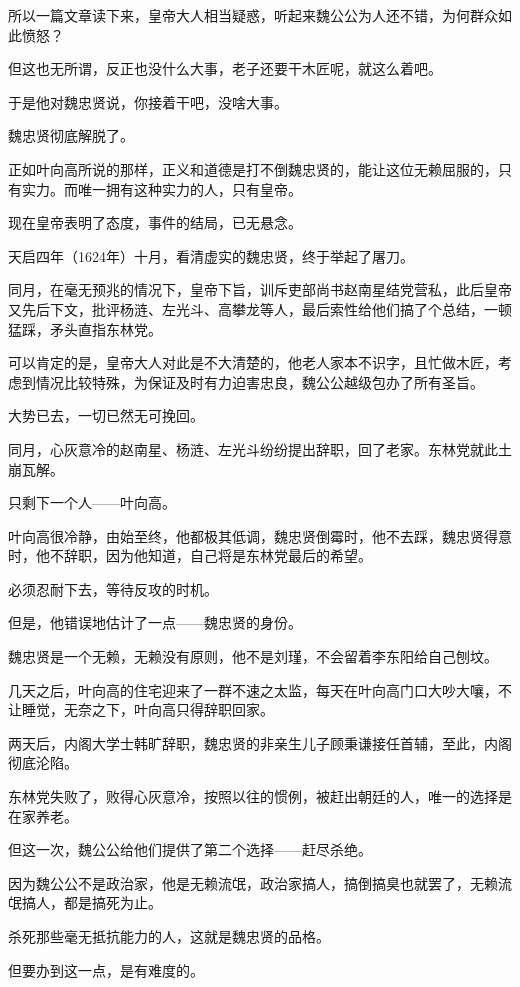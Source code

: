 \begin{multicols}{\theparacolNo}
		所以一篇文章读下来，皇帝大人相当疑惑，听起来魏公公为人还不错，为何群众如此愤怒？

		但这也无所谓，反正也没什么大事，老子还要干木匠呢，就这么着吧。

		于是他对魏忠贤说，你接着干吧，没啥大事。

		魏忠贤彻底解脱了。

		正如叶向高所说的那样，正义和道德是打不倒魏忠贤的，能让这位无赖屈服的，只有实力。而唯一拥有这种实力的人，只有皇帝。

		现在皇帝表明了态度，事件的结局，已无悬念。

		天启四年（1624年）十月，看清虚实的魏忠贤，终于举起了屠刀。

		同月，在毫无预兆的情况下，皇帝下旨，训斥吏部尚书赵南星结党营私，此后皇帝又先后下文，批评杨涟、左光斗、高攀龙等人，最后索性给他们搞了个总结，一顿猛踩，矛头直指东林党。

		可以肯定的是，皇帝大人对此是不大清楚的，他老人家本不识字，且忙做木匠，考虑到情况比较特殊，为保证及时有力迫害忠良，魏公公越级包办了所有圣旨。

		大势已去，一切已然无可挽回。

		同月，心灰意冷的赵南星、杨涟、左光斗纷纷提出辞职，回了老家。东林党就此土崩瓦解。

		只剩下一个人——叶向高。

		叶向高很冷静，由始至终，他都极其低调，魏忠贤倒霉时，他不去踩，魏忠贤得意时，他不辞职，因为他知道，自己将是东林党最后的希望。

		必须忍耐下去，等待反攻的时机。

		但是，他错误地估计了一点——魏忠贤的身份。

		魏忠贤是一个无赖，无赖没有原则，他不是刘瑾，不会留着李东阳给自己刨坟。

		几天之后，叶向高的住宅迎来了一群不速之太监，每天在叶向高门口大吵大嚷，不让睡觉，无奈之下，叶向高只得辞职回家。

		两天后，内阁大学士韩旷辞职，魏忠贤的非亲生儿子顾秉谦接任首辅，至此，内阁彻底沦陷。

		东林党失败了，败得心灰意冷，按照以往的惯例，被赶出朝廷的人，唯一的选择是在家养老。

		但这一次，魏公公给他们提供了第二个选择——赶尽杀绝。

		因为魏公公不是政治家，他是无赖流氓，政治家搞人，搞倒搞臭也就罢了，无赖流氓搞人，都是搞死为止。

		杀死那些毫无抵抗能力的人，这就是魏忠贤的品格。

		但要办到这一点，是有难度的。


\end{multicols}

